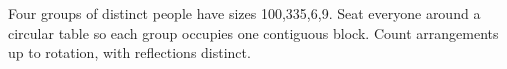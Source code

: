 Four groups of distinct people have sizes 100,335,6,9. Seat everyone around a circular table so each group occupies one contiguous block. Count arrangements up to rotation, with reflections distinct.
